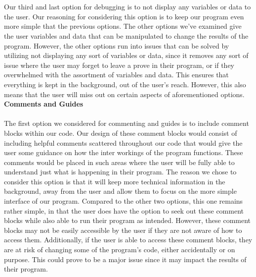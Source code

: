 \documentclass[journal,10pt,onecolumn,compsoc]{IEEEtran} \usepackage[margin=1.0in]{geometry} \usepackage{pdfpages} \usepackage{graphicx}
\begin{document}
\\ 
\\
\indent Our third and last option for debugging is to not display any variables or data to the user. Our reasoning for considering this option is to keep our program even more simple that the previous options. The other options we've examined give the user variables and data that can be manipulated to change the results of the program. However, the other options run into issues that can be solved by utilizing not displaying any sort of variables or data, since it removes any sort of issue where the user may forget to leave a prove in their program, or if they overwhelmed with the assortment of variables and data. This ensures that everything is kept in the background, out of the user's reach. However, this also means that the user will miss out on certain aspects of aforementioned options.
\\
\newpage
\noindent \textbf{Comments and Guides} 
\\
\\
\indent The first option we considered for commenting and guides is to include comment blocks within our code. Our design of these comment blocks would consist of including helpful comments scattered throughout our code that would give the user some guidance on how the inter workings of the program functions. These comments would be placed in such areas where the user will be fully able to understand just what is happening in their program. The reason we chose to consider this option is that it will keep more technical information in the background, away from the user and allow them to focus on the more simple interface of our program. Compared to the other two options, this one remains rather simple, in that the user does have the option to seek out these comment blocks while also able to run their program as intended. However, these comment blocks may not be easily accessible by the user if they are not aware of how to access them. Additionally, if the user is able to access these comment blocks, they are at risk of changing some of the program's code, either accidentally or on purpose. This could prove to be a major issue since it may impact the results of their program. 
\\
\\
\end{document}
